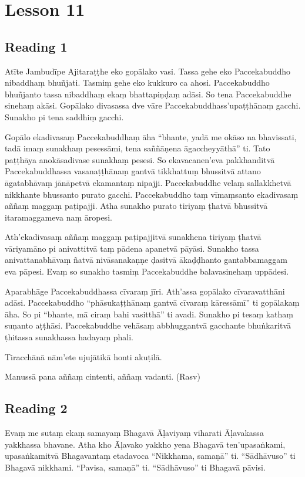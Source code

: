 \chapter{Lesson 11}

\section*{Reading 1}

Atīte Jambudīpe Ajitaraṭṭhe eko gopālako vasi. Tassa gehe eko Paccekabuddho nibaddhaṃ bhuñjati. Tasmiṃ gehe eko kukkuro ca ahosi. Paccekabuddho bhuñjanto tassa nibaddhaṃ ekaṃ bhattapiṇḍaṃ adāsi. So tena Paccekabuddhe sinehaṃ akāsi. Gopālako divasassa dve vāre Paccekabuddhass’upaṭṭhānaṃ gacchi. Sunakho pi tena saddhiṃ gacchi.

Gopālo ekadivasaṃ Paccekabuddhaṃ āha “bhante, yadā me okāso na bhavissati, tadā imaṃ sunakhaṃ pesessāmi, tena saññāṇena āgaccheyyāthā” ti. Tato paṭṭhāya anokāsadivase sunakhaṃ pesesi. So ekavacanen’eva pakkhanditvā Paccekabuddhassa vasanaṭṭhānaṃ gantvā tikkhattuṃ bhussitvā attano āgatabhāvaṃ jānāpetvā ekamantaṃ nipajji. Paccekabuddhe velaṃ sallakkhetvā nikkhante bhussanto purato gacchi. Paccekabuddho taṃ vīmaṃsanto ekadivasaṃ aññaṃ maggaṃ paṭipajji. Atha sunakho purato tiriyaṃ ṭhatvā bhussitvā itaramaggameva naṃ āropesi.

Ath’ekadivasaṃ aññaṃ maggaṃ paṭipajjitvā sunakhena tiriyaṃ ṭhatvā vāriyamāno pi anivattitvā taṃ pādena apanetvā pāyāsi. Sunakho tassa anivattanabhāvaṃ ñatvā nivāsanakaṇṇe ḍasitvā ākaḍḍhanto gantabbamaggam eva pāpesi. Evaṃ so sunakho tasmiṃ Paccekabuddhe balavasinehaṃ uppādesi.

Aparabhāge Paccekabuddhassa cīvaraṃ jīri. Ath’assa gopālako cīvaravatthāni adāsi. Paccekabuddho “phāsukaṭṭhānaṃ gantvā cīvaraṃ kāressāmī” ti gopālakaṃ āha. So pi “bhante, mā ciraṃ bahi vasitthā” ti avadi. Sunakho pi tesaṃ kathaṃ suṇanto aṭṭhāsi. Paccekabuddhe vehāsaṃ abbhuggantvā gacchante bhuṅkaritvā ṭhitassa sunakhassa hadayaṃ phali.

Tiracchānā nām’ete ujujātikā honti akuṭilā.

Manussā pana aññaṃ cintenti, aññaṃ vadanti. \hfill(Rasv)

\section*{Reading 2}

Evaṃ me sutaṃ ekaṃ samayaṃ Bhagavā Āḷaviyaṃ viharati Āḷavakassa yakkhassa bhavane. Atha kho Āḷavako yakkho yena Bhagavā ten’upasaṅkami, upasaṅkamitvā Bhagavantaṃ etadavoca “Nikkhama, samaṇā” ti. “Sādhāvuso” ti Bhagavā nikkhami. “Pavisa, samaṇā” ti. “Sādhāvuso” ti Bhagavā pāvisi.

